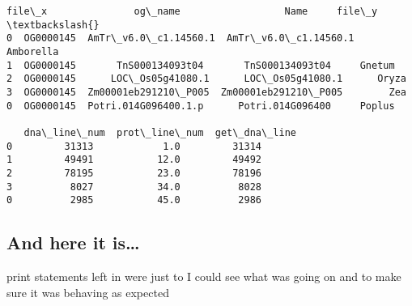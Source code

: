 \documentclass[11pt]{article}
\begin{document}
    \begin{Verbatim}[commandchars=\\\{\}]
      file\_x               og\_name                  Name     file\_y  \textbackslash{}
0  OG0000145  AmTr\_v6.0\_c1.14560.1  AmTr\_v6.0\_c1.14560.1  Amborella
1  OG0000145       TnS000134093t04       TnS000134093t04     Gnetum
2  OG0000145      LOC\_Os05g41080.1      LOC\_Os05g41080.1      Oryza
3  OG0000145  Zm00001eb291210\_P005  Zm00001eb291210\_P005        Zea
0  OG0000145  Potri.014G096400.1.p      Potri.014G096400     Poplus

   dna\_line\_num  prot\_line\_num  get\_dna\_line
0         31313            1.0         31314
1         49491           12.0         49492
2         78195           23.0         78196
3          8027           34.0          8028
0          2985           45.0          2986
    \end{Verbatim}

    \hypertarget{and-here-it-is}{%
\subsection{And here it is\ldots{}}\label{and-here-it-is}}

print statements left in were just to I could see what was going on and
to make sure it was behaving as expected
\end{document}
